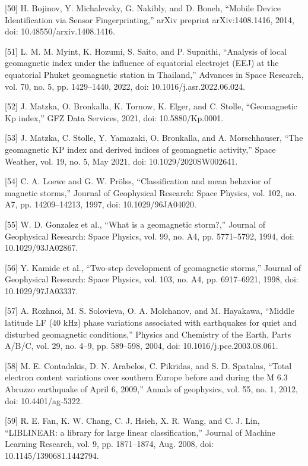 \let\LaTeXcline\cline\documentclass[sn-mathphys-num]{sn-jnl}\let\cline\LaTeXcline
\begin{document}
[50] H. Bojinov, Y. Michalevsky, G. Nakibly, and D. Boneh, “Mobile Device Identification via Sensor Fingerprinting,” arXiv preprint arXiv:1408.1416, 2014, doi: 10.48550/arxiv.1408.1416.

[51] L. M. M. Myint, K. Hozumi, S. Saito, and P. Supnithi, “Analysis of local geomagnetic index under the influence of equatorial electrojet (EEJ) at the equatorial Phuket geomagnetic station in Thailand,” Advances in Space Research, vol. 70, no. 5, pp. 1429–1440, 2022, doi: 10.1016/j.asr.2022.06.024.

[52] J. Matzka, O. Bronkalla, K. Tornow, K. Elger, and C. Stolle, “Geomagnetic Kp index,” GFZ Data Services, 2021, doi: 10.5880/Kp.0001.

[53] J. Matzka, C. Stolle, Y. Yamazaki, O. Bronkalla, and A. Morschhauser, “The geomagnetic KP index and derived indices of geomagnetic activity,” Space Weather, vol. 19, no. 5, May 2021, doi: 10.1029/2020SW002641.

[54] C. A. Loewe and G. W. Prölss, “Classification and mean behavior of magnetic storms,” Journal of Geophysical Research: Space Physics, vol. 102, no. A7, pp. 14209–14213, 1997, doi: 10.1029/96JA04020.

[55] W. D. Gonzalez et al., “What is a geomagnetic storm?,” Journal of Geophysical Research: Space Physics, vol. 99, no. A4, pp. 5771–5792, 1994, doi: 10.1029/93JA02867.

[56] Y. Kamide et al., “Two-step development of geomagnetic storms,” Journal of Geophysical Research: Space Physics, vol. 103, no. A4, pp. 6917–6921, 1998, doi: 10.1029/97JA03337.

[57] A. Rozhnoi, M. S. Solovieva, O. A. Molchanov, and M. Hayakawa, “Middle latitude LF (40 kHz) phase variations associated with earthquakes for quiet and disturbed geomagnetic conditions,” Physics and Chemistry of the Earth, Parts A/B/C, vol. 29, no. 4–9, pp. 589–598, 2004, doi: 10.1016/j.pce.2003.08.061.

[58] M. E. Contadakis, D. N. Arabelos, C. Pikridas, and S. D. Spatalas, “Total electron content variations over southern Europe before and during the M 6.3 Abruzzo earthquake of April 6, 2009,” Annals of geophysics, vol. 55, no. 1, 2012, doi: 10.4401/ag-5322.

[59] R. E. Fan, K. W. Chang, C. J. Hsieh, X. R. Wang, and C. J. Lin, “LIBLINEAR: a library for large linear classification,” Journal of Machine Learning Research, vol. 9, pp. 1871–1874, Aug. 2008, doi: 10.1145/1390681.1442794.
\end{document}
